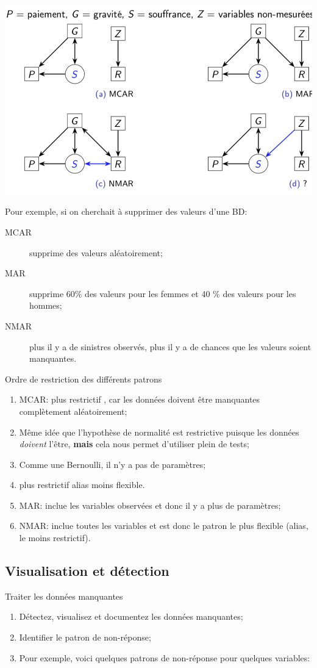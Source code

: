 \documentclass[10pt, french]{article}
\begin{document}
\begin{multicols*}{3}
\includegraphics[scale=0.2]{src/ACT-3114/data-schema-missing.png}

Pour exemple, si on cherchait à supprimer des valeurs d'une BD:
\begin{description}
	\item[MCAR]	supprime des valeurs aléatoirement;
	\item[MAR]	supprime 60\% des valeurs pour les femmes et 40 \% des valeurs pour les hommes;
	\item[NMAR]	plus il y a de sinistres observés, plus il y a de chances que les valeurs soient manquantes.
\end{description}

Ordre de restriction des différents patrons
\begin{enumerate}
	\item	MCAR: plus \og restrictif \fg{}, car les données doivent être manquantes complètement aléatoirement;
	\item[]	Même idée que l'hypothèse de normalité est restrictive puisque les données \textit{doivent} l'être, \textbf{mais} cela nous permet d'utiliser plein de tests;
	\item[]	Comme une Bernoulli, il n'y a pas de paramètres;
	\item[]	plus restrictif alias moins flexible.
	\item	MAR: inclue les variables observées et donc il y a plus de paramètres;
	\item	NMAR: inclue toutes les variables et est donc le patron le plus flexible (alias, le moins restrictif).
\end{enumerate}

\subsection*{Visualisation et détection}
\begin{algo}{Traiter les données manquantes}
\begin{enumerate}
	\item	Détectez, visualisez et documentez les données manquantes;
	\item	Identifier le patron de non-réponse;
	\item[]	Pour exemple, voici quelques patrons de non-réponse pour quelques variables:


\end{enumerate}
\end{algo}
\end{multicols*}
\end{document}
